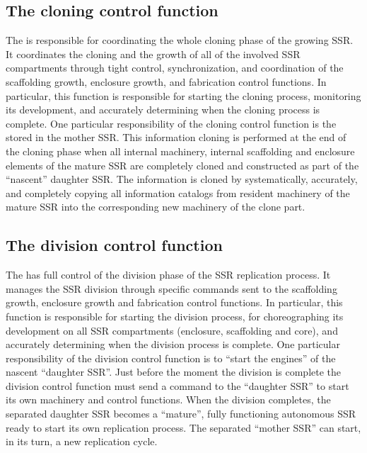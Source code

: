 \subsection[The cloning control function]{The cloning control function}

The  is responsible for coordinating the whole cloning phase of the
growing SSR. It coordinates the cloning and the
growth of all of the involved SSR compartments through tight control,
synchronization, and coordination of the scaffolding growth, enclosure
growth, and fabrication control functions. In particular, this function is responsible
for starting the cloning process, monitoring its development,
and accurately determining when the cloning process is complete. One
particular responsibility of the cloning control function is the
 stored in the mother SSR. This
information cloning is performed at the end of the cloning phase when
all internal machinery, internal scaffolding and enclosure elements of
the mature SSR are completely cloned and constructed as part of the
“nascent” daughter SSR. The information is cloned by systematically,
accurately, and completely copying all information catalogs from
resident machinery of the mature SSR into the corresponding new
machinery of the clone part.

\subsection[The division control function]{The division control function}

The  has full control of the division phase of the SSR replication
process. It manages the SSR division through specific commands sent to
the scaffolding growth, enclosure growth and fabrication control
functions.  In particular, this function is responsible for starting the
division process, for choreographing its development on all SSR
compartments (enclosure, scaffolding and core), and accurately
determining when the division process is complete. One particular
responsibility of the division control function is to “start the
engines” of the nascent “daughter SSR”. Just before the moment the
division is complete the division control function must send a command
to the “daughter SSR” to start its own machinery and control functions.
When the division completes, the separated daughter SSR
becomes a “mature”, fully functioning autonomous SSR ready to start its
own replication process. The separated “mother SSR” can start, in its
turn, a new replication cycle.

